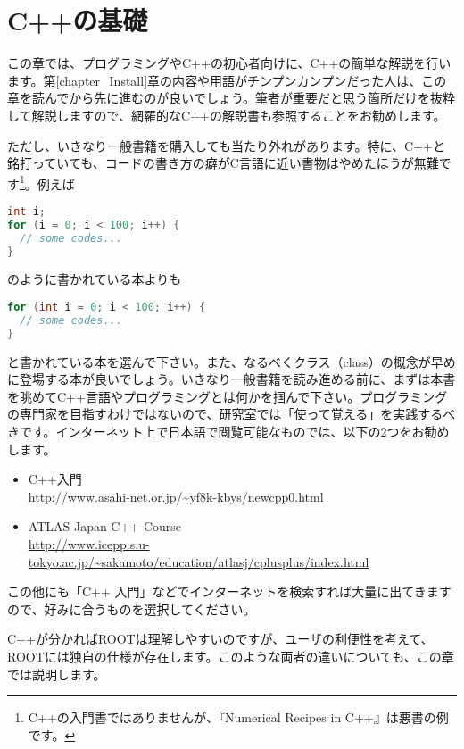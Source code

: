 \chapter{C++の基礎}
\label{chapter_C++}

この章では、プログラミングやC++の初心者向けに、C++の簡単な解説を行います。第\ref{chapter_Install}章の内容や用語がチンプンカンプンだった人は、この章を読んでから先に進むのが良いでしょう。筆者が重要だと思う箇所だけを抜粋して解説しますので、網羅的なC++の解説書も参照することをお勧めします。

ただし、いきなり一般書籍を購入しても当たり外れがあります。特に、C++と銘打っていても、コードの書き方の癖がC言語に近い書物はやめたほうが無難です\footnote{C++の入門書ではありませんが、『Numerical Recipes in C++』は悪書の例です。}。例えば
\begin{lstlisting}[language=c++]
int i;
for (i = 0; i < 100; i++) {
  // some codes...
}
\end{lstlisting}
のように書かれている本よりも
\begin{lstlisting}[language=c++]
for (int i = 0; i < 100; i++) {
  // some codes...
}
\end{lstlisting}
と書かれている本を選んで下さい。また、なるべくクラス（class）の概念が早めに登場する本が良いでしょう。いきなり一般書籍を読み進める前に、まずは本書を眺めてC++言語やプログラミングとは何かを掴んで下さい。プログラミングの専門家を目指すわけではないので、研究室では「使って覚える」を実践するべきです。インターネット上で日本語で閲覧可能なものでは、以下の2つをお勧めします。
\begin{itemize}
\item C++入門\\
\url{http://www.asahi-net.or.jp/~yf8k-kbys/newcpp0.html}
\item ATLAS Japan C++ Course\\
\url{http://www.icepp.s.u-tokyo.ac.jp/~sakamoto/education/atlasj/cplusplus/index.html}
\end{itemize}
この他にも「C++ 入門」などでインターネットを検索すれば大量に出てきますので、好みに合うものを選択してください。

C++が分かればROOTは理解しやすいのですが、ユーザの利便性を考えて、ROOTには独自の仕様が存在します。このような両者の違いについても、この章では説明します。 
\clearpage
